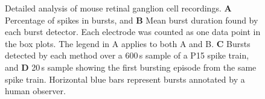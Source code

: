\documentclass[12pt, titlepage]{article}
\begin{document}
		\begin{figure}[h]
			\centering
			\caption{Detailed analysis of mouse retinal ganglion cell recordings. \textbf{A} Percentage of spikes in bursts, and \textbf{B} Mean burst duration found by each burst detector. Each electrode was counted as one data point in the box plots. The legend in A applies to both A and B. \textbf{C} Bursts detected by each method over a 600$\,$s sample of a P15 spike train, and \textbf{D} 20$\,$s sample showing the first bursting episode from the same spike train. Horizontal blue bars represent bursts annotated by a human observer.  }
			\label{RGC_results}
		\end{figure}
\end{document}
